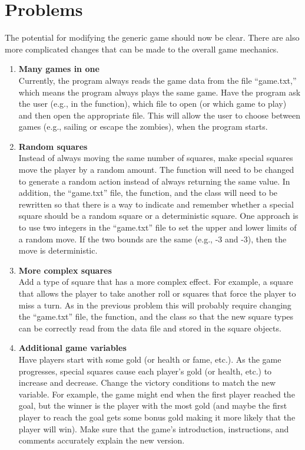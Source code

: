 \section{Problems}
The potential for modifying the generic game should now be clear.  There are also more complicated changes that can be made to the overall game mechanics.
\begin{enumerate}[{\bf 1.}]

\item {\bf Many games in one}\\
 Currently, the program always reads the game data from the file ``game.txt,'' which means the program always plays the same game.  Have the program ask the user (e.g., in the  function), which file to open (or which game to play) and then open the appropriate file.  This will allow the user to choose between games (e.g., sailing or escape the zombies), when the program starts.

\item {\bf Random squares}\\
 Instead of always moving the same number of squares, make special squares move the player by a random amount.  The  function will need to be changed to generate a random action instead of always returning the same value.  
In addition, the ``game.txt'' file, the  function, and the  class will need to be rewritten so that there is a way to indicate and remember whether a special square should be a random square or a deterministic square.  One approach is to use two integers in the ``game.txt'' file to set the upper and lower limits of a random move.  If the two bounds are the same (e.g., -3 and -3), then the move is deterministic.

\item {\bf More complex squares}\\
 Add a type of square that has a more complex effect.  For example, a square that allows the player to take another roll or squares that force the player to miss a turn.  As in the previous problem this will probably require changing the ``game.txt'' file, the  function, and the  class so that the new square types can be correctly read from the data file and stored in the square objects.

\item {\bf Additional game variables}\\
 Have players start with some gold (or health or fame, etc.).  As the game progresses, special squares cause each player's gold (or health, etc.) to increase and decrease.  Change the victory conditions to match the new variable.  For example, the game might end when the first player reached the goal, but the winner is the player with the most gold (and maybe the first player to reach the goal gets some bonus gold making it more likely that the player will win).  Make sure that the game's introduction, instructions, and comments accurately explain the new version.


\end{enumerate}
